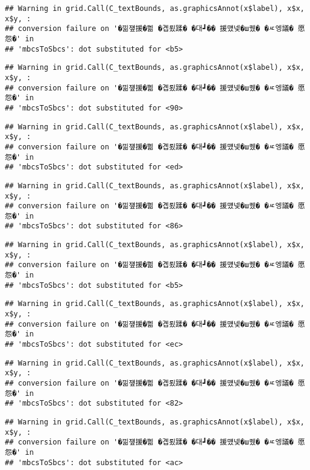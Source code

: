 \documentclass[
]{article}
\begin{document}
\begin{verbatim}
## Warning in grid.Call(C_textBounds, as.graphicsAnnot(x$label), x$x, x$y, :
## conversion failure on '�낆쟾援�쁾 �곕룄蹂� �대┛�� 援먰넻�ш퀬� �ㅼ엥議� 愿怨�' in
## 'mbcsToSbcs': dot substituted for <b5>
\end{verbatim}

\begin{verbatim}
## Warning in grid.Call(C_textBounds, as.graphicsAnnot(x$label), x$x, x$y, :
## conversion failure on '�낆쟾援�쁾 �곕룄蹂� �대┛�� 援먰넻�ш퀬� �ㅼ엥議� 愿怨�' in
## 'mbcsToSbcs': dot substituted for <90>
\end{verbatim}

\begin{verbatim}
## Warning in grid.Call(C_textBounds, as.graphicsAnnot(x$label), x$x, x$y, :
## conversion failure on '�낆쟾援�쁾 �곕룄蹂� �대┛�� 援먰넻�ш퀬� �ㅼ엥議� 愿怨�' in
## 'mbcsToSbcs': dot substituted for <ed>
\end{verbatim}

\begin{verbatim}
## Warning in grid.Call(C_textBounds, as.graphicsAnnot(x$label), x$x, x$y, :
## conversion failure on '�낆쟾援�쁾 �곕룄蹂� �대┛�� 援먰넻�ш퀬� �ㅼ엥議� 愿怨�' in
## 'mbcsToSbcs': dot substituted for <86>
\end{verbatim}

\begin{verbatim}
## Warning in grid.Call(C_textBounds, as.graphicsAnnot(x$label), x$x, x$y, :
## conversion failure on '�낆쟾援�쁾 �곕룄蹂� �대┛�� 援먰넻�ш퀬� �ㅼ엥議� 愿怨�' in
## 'mbcsToSbcs': dot substituted for <b5>
\end{verbatim}

\begin{verbatim}
## Warning in grid.Call(C_textBounds, as.graphicsAnnot(x$label), x$x, x$y, :
## conversion failure on '�낆쟾援�쁾 �곕룄蹂� �대┛�� 援먰넻�ш퀬� �ㅼ엥議� 愿怨�' in
## 'mbcsToSbcs': dot substituted for <ec>
\end{verbatim}

\begin{verbatim}
## Warning in grid.Call(C_textBounds, as.graphicsAnnot(x$label), x$x, x$y, :
## conversion failure on '�낆쟾援�쁾 �곕룄蹂� �대┛�� 援먰넻�ш퀬� �ㅼ엥議� 愿怨�' in
## 'mbcsToSbcs': dot substituted for <82>
\end{verbatim}

\begin{verbatim}
## Warning in grid.Call(C_textBounds, as.graphicsAnnot(x$label), x$x, x$y, :
## conversion failure on '�낆쟾援�쁾 �곕룄蹂� �대┛�� 援먰넻�ш퀬� �ㅼ엥議� 愿怨�' in
## 'mbcsToSbcs': dot substituted for <ac>
\end{verbatim}
\end{document}
